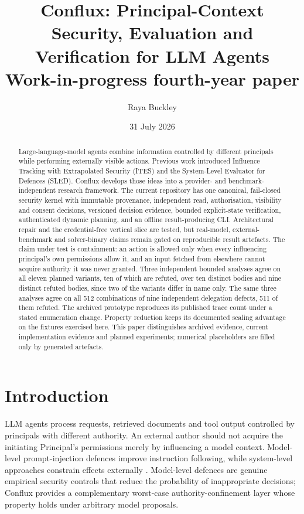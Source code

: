 \documentclass[11pt]{article}
\title{Conflux: Principal-Context Security, Evaluation and Verification for LLM Agents\\\large Work-in-progress fourth-year paper}
\author{Raya Buckley}
\date{31 July 2026}
\begin{document}
\maketitle

\begin{abstract}
Large-language-model agents combine information controlled by different
principals while performing externally visible actions. Previous work
introduced Influence Tracking with Extrapolated Security (ITES) and the
System-Level Evaluator for Defences (SLED). Conflux develops those ideas into a
provider- and benchmark-independent research framework. The current repository
has one canonical, fail-closed security kernel with immutable provenance,
independent read, authorisation, visibility and consent decisions, versioned
decision evidence, bounded explicit-state verification, authenticated dynamic
planning, and an offline result-producing CLI. Architectural repair and the
credential-free vertical slice are tested, but real-model, external-benchmark
and solver-binary claims remain gated on reproducible result artefacts. The
claim under test is containment: an action is allowed only when every
influencing principal's own permissions allow it, and an input fetched from
elsewhere cannot acquire authority it was never granted. Three independent
bounded analyses agree on all eleven planned variants, ten of which are refuted,
over ten distinct bodies and nine distinct refuted bodies, since two of the
variants differ in name only. The same three analyses agree on all 512
combinations of nine independent delegation defects, 511 of them refuted. The
archived prototype reproduces its published trace count under a stated
enumeration change. Property reduction keeps its documented scaling advantage on
the fixtures exercised here. This paper distinguishes archived
evidence, current implementation evidence and planned experiments; numerical
placeholders are filled only by generated artefacts.
\end{abstract}

\section{Introduction}
LLM agents process requests, retrieved documents and tool output controlled by
principals with different authority. An external author should not acquire the
initiating Principal's permissions merely by influencing a model context.
Model-level prompt-injection defences improve instruction following, while
system-level approaches constrain effects externally
\citep{camel,designpatterns,struq,spotlighting}.
Model-level defences are genuine empirical security controls that reduce the
probability of inappropriate decisions; Conflux provides a complementary
worst-case authority-confinement layer whose property holds under arbitrary
model proposals.
\end{document}

